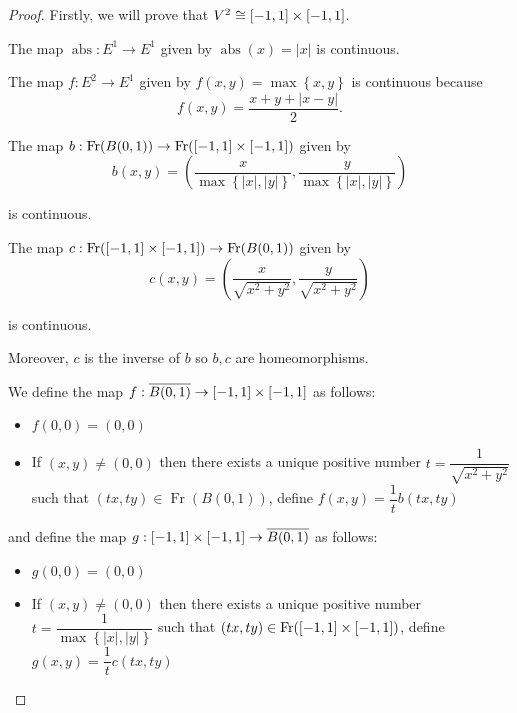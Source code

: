 \begin{proof}
	Firstly, we will prove that \( V^{2} \cong \left\lbrack{-1, 1}\right\rbrack \times \left\lbrack{-1, 1}\right\rbrack \).

	The map \( \operatorname{abs}: E^{1} \to E^{1} \) given by \( \operatorname{abs}(x) = \left\vert x \right\vert \) is continuous.

	The map \( f: E^{2} \to E^{1} \) given by \( f(x, y) = \max\left\{ x, y \right\} \) is continuous because
	\[
		f(x, y) = \dfrac{x + y + \left\vert x - y \right\vert}{2}.
	\]

	The map \( b: \operatorname{Fr}(B(0, 1)) \to \operatorname{Fr}(\left\lbrack{-1, 1}\right\rbrack \times \left\lbrack{-1, 1}\right\rbrack) \) given by
	\[
		b(x, y) = \left( \dfrac{x}{\max\left\{ \left\vert x \right\vert, \left\vert y \right\vert \right\}}, \dfrac{y}{\max\left\{ \left\vert x \right\vert, \left\vert y \right\vert \right\}} \right)
	\]

	is continuous.

	The map \( c: \operatorname{Fr}(\left\lbrack{-1, 1}\right\rbrack \times \left\lbrack{-1, 1}\right\rbrack) \to \operatorname{Fr}(B(0, 1)) \) given by
	\[
		c(x, y) = \left( \dfrac{x}{\sqrt{x^{2} + y^{2}}}, \dfrac{y}{\sqrt{x^{2} + y^{2}}} \right)
	\]

	is continuous.

	Moreover, \( c \) is the inverse of \( b \) so \( b, c \) are homeomorphisms.

	We define the map \( f: \overline{B(0, 1)} \to \left\lbrack{-1, 1}\right\rbrack \times \left\lbrack{-1, 1}\right\rbrack \) as follows:
	\begin{itemize}
		\item \( f(0, 0) = (0, 0) \)
		\item If \( (x, y) \ne (0, 0) \) then there exists a unique positive number \( t = \dfrac{1}{\sqrt{x^{2} + y^{2}}} \) such that \( (tx, ty) \in \operatorname{Fr}(B(0, 1)) \), define \( f(x, y) = \dfrac{1}{t} b(tx, ty) \)
	\end{itemize}

	and define the map \( g: \left\lbrack{-1, 1}\right\rbrack \times \left\lbrack{-1, 1}\right\rbrack \to \overline{B(0, 1)} \) as follows:
	\begin{itemize}
		\item \( g(0, 0) = (0, 0) \)
		\item If \( (x, y) \ne (0, 0) \) then there exists a unique positive number \( t = \dfrac{1}{\max\left\{ \left\vert x\right\vert, \left\vert y\right\vert \right\}} \) such that \( (tx, ty) \in \operatorname{Fr}(\left\lbrack{-1, 1}\right\rbrack \times \left\lbrack{-1, 1}\right\rbrack) \), define \( g(x, y) = \dfrac{1}{t}c(tx, ty) \)
	\end{itemize}


\end{proof}
